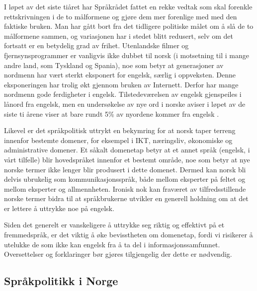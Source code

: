 \begin{multicols}{2}
I løpet av det siste tiåret har Språkrådet fattet en rekke vedtak som skal forenkle rettskrivningen i de to målformene og gjøre dem mer forenlige med med den faktiske bruken. Man har gått bort fra det tidligere politiske målet om å slå de to målformene sammen, og variasjonen har i stedet blitt redusert, selv om det fortsatt er en betydelig grad av frihet.
Utenlandske filmer og fjernsynsprogrammer er vanligvis ikke dubbet til norsk (i motsetning til i mange andre land, som Tyskland og Spania), noe som betyr at generasjoner av nordmenn har vært sterkt eksponert for engelsk, særlig i oppveksten. 
Denne eksponeringen har trolig økt gjennom bruken av Internett. 
Derfor har mange nordmenn gode ferdigheter i engelsk. 
Tilstedeværelsen av engelsk gjenspeiles i lånord fra engelsk, men en undersøkelse av nye ord i norske aviser i løpet av de siste ti årene viser at bare rundt 5\% av nyordene kommer fra engelsk \cite{And:2011}.


Likevel er det språkpolitisk uttrykt en bekymring \cite{nih:2005} for at norsk taper terreng innenfor bestemte domener, for eksempel i IKT, næringsliv, økonomiske og administrative domener. 
Et såkalt domenetap betyr at et annet språk (engelsk, i vårt tilfelle) blir hovedspråket innenfor et bestemt område, noe som betyr at nye norske termer ikke lenger blir produsert i dette domenet. 
Dermed kan norsk bli delvis ubrukelig som kommunikasjonsspråk, både mellom eksperter på feltet og mellom eksperter og allmennheten. Ironisk nok kan fraværet av tilfredsstillende norske termer bidra til at språkbrukerne utvikler en generell holdning om at det er lettere å uttrykke noe på engelsk. 

Siden det generelt er vanskeligere å uttrykke seg riktig og effektivt på et fremmedspråk, er det viktig å øke bevisstheten om domenetap, fordi vi risikerer å utelukke de som ikke kan engelsk fra å ta del i informasjonssamfunnet.
Oversettelser og forklaringer bør gjøres tilgjengelig der dette er nødvendig.

\subsection{Språkpolitikk i Norge}


\end{multicols}
